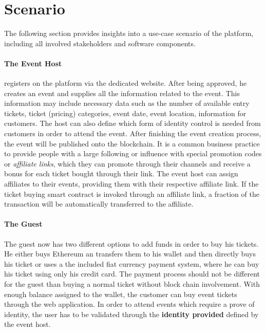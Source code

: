 \section{Scenario}
The following section provides insights into a use-case scenario of the platform, including all involved stakeholders and software components.

\paragraph{The Event Host} registers on the platform via the dedicated website. After being approved, he creates an event and supplies all the information related to the event. This information may include necessary data such as the number of available entry tickets, ticket (pricing) categories, event date, event location, information for customers. The host can also define which form of identity control is needed from customers in order to attend the event. After finishing the event creation process, the event will be published onto the blockchain.
It is a common business practice to provide people with a large following or influence with special promotion codes or \textit{affiliate links}, which they can promote through their channels and receive a bonus for each ticket bought through their link. The event host can assign affiliates to their events, providing them with their respective affiliate link. If the ticket buying smart contract is invoked through an affiliate link, a fraction of the transaction will be automatically transferred to the affiliate.  

\paragraph{The Guest} %
The guest now has two different options to add funds in order to buy his tickets. He either buys Ethereum an transfers them to his wallet and then directly buys his ticket or uses a the included fiat currency payment system, where he can buy his ticket using only his credit card.
The payment process should not be different for the guest than buying a normal ticket without block chain involvement.
With enough balance assigned to the wallet, the customer can buy event tickets through the web application.
In order to attend events which require a prove of identity, the user has to be validated through the \textbf{identity provided} defined by the event host.

